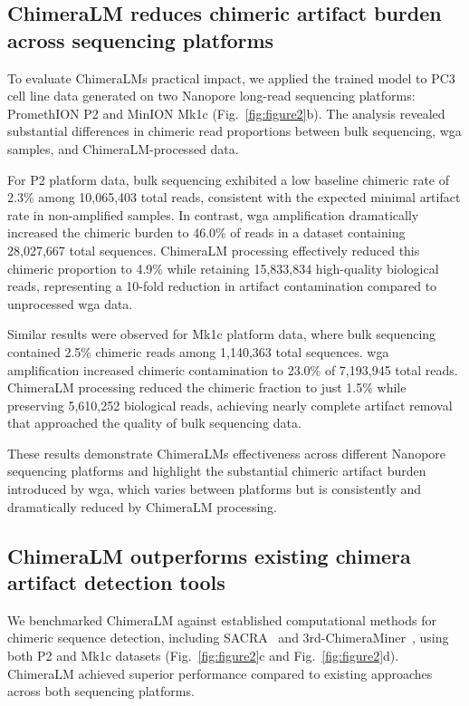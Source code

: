 \documentclass[pdflatex,sn-nature]{sn-jnl}%
\theoremstyle{thmstyleone}%
\theoremstyle{thmstyletwo}%
\theoremstyle{thmstylethree}%
\begin{document}
\subsection*{ChimeraLM reduces chimeric artifact burden across sequencing platforms}

To evaluate ChimeraLM\textquotesingle s practical impact, we applied the trained model to PC3 cell line data generated on two Nanopore long-read sequencing platforms: PromethION P2 and MinION Mk1c (Fig.~\ref{fig:figure2}b).
The analysis revealed substantial differences in chimeric read proportions between bulk sequencing, \gls{wga} samples, and ChimeraLM-processed data.

For P2 platform data, bulk sequencing exhibited a low baseline chimeric rate of 2.3\% among 10,065,403 total reads, consistent with the expected minimal artifact rate in non-amplified samples.
In contrast, \gls{wga} amplification dramatically increased the chimeric burden to 46.0\% of reads in a dataset containing 28,027,667 total sequences.
ChimeraLM processing effectively reduced this chimeric proportion to 4.9\% while retaining 15,833,834 high-quality biological reads, representing a 10-fold reduction in artifact contamination compared to unprocessed \gls{wga} data.

Similar results were observed for Mk1c platform data, where bulk sequencing contained 2.5\% chimeric reads among 1,140,363 total sequences.
\gls{wga} amplification increased chimeric contamination to 23.0\% of 7,193,945 total reads.
ChimeraLM processing reduced the chimeric fraction to just 1.5\% while preserving 5,610,252 biological reads, achieving nearly complete artifact removal that approached the quality of bulk sequencing data.

These results demonstrate ChimeraLM\textquotesingle s effectiveness across different Nanopore sequencing platforms and highlight the substantial chimeric artifact burden introduced by \gls{wga}, which varies between platforms but is consistently and dramatically reduced by ChimeraLM processing.


\subsection*{ChimeraLM outperforms existing chimera artifact detection tools}

We benchmarked ChimeraLM against established computational methods for chimeric sequence detection, including SACRA~\cite{kiguchi2021long} and 3rd-ChimeraMiner~\cite{lu2023exploration}, using both P2 and Mk1c datasets (Fig.~\ref{fig:figure2}c and Fig.~\ref{fig:figure2}d).
ChimeraLM achieved superior performance compared to existing approaches across both sequencing platforms.
\end{document}
